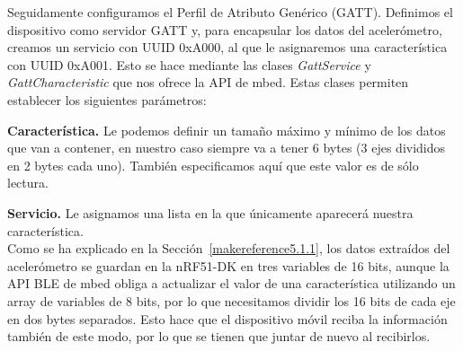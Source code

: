 Seguidamente configuramos el Perfil de Atributo Genérico (GATT). Definimos el dispositivo como servidor GATT y, para encapsular los datos del acelerómetro, creamos un servicio con UUID 0xA000, al que le asignaremos una característica con UUID 0xA001. Esto se hace mediante las clases \textit{GattService} y \textit{GattCharacteristic} que nos ofrece la API de mbed. Estas clases permiten establecer los siguientes parámetros:

\textbf{Característica.} Le podemos definir un tamaño máximo y mínimo de los datos que van a contener, en nuestro caso siempre va a tener 6 bytes (3 ejes divididos en 2 bytes cada uno). También especificamos aquí que este valor es de sólo lectura.

\textbf{Servicio.} Le asignamos una lista en la que únicamente aparecerá nuestra característica.\\

Como se ha explicado en la Sección~\ref{makereference5.1.1}, los datos extraídos del acelerómetro se guardan en la nRF51-DK en tres variables de 16 bits, aunque la API BLE de mbed obliga a actualizar el valor de una característica utilizando un array de variables de 8 bits, por lo que necesitamos dividir los 16 bits de cada eje en dos bytes separados. Esto hace que el dispositivo móvil reciba la información también de este modo, por lo que se tienen que juntar de nuevo al recibirlos.
